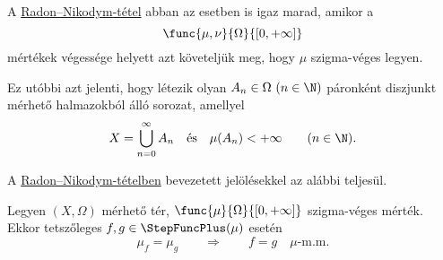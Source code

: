 \documentclass[
]{elteikthesis}[2024/04/26]
\begin{document}
	\begin{notes}
		\item
		A \hyperref[th:radon-nikodym]{Radon--Nikodym-tétel} abban az esetben is igaz marad,
		amikor a
		\[
			\func{\mu, \nu}{\Omega}{[0, +\infty]}
		\]
		mértékek végessége helyett azt követeljük meg, hogy \( \mu \) szigma-véges legyen.
		
		Ez utóbbi azt jelenti, hogy létezik olyan \( A_n \in \Omega \ (n \in \N) \)
		páronként diszjunkt mérhető halmazokból álló sorozat, amellyel
		\[
			X = \bigcup_{n = 0}^{\infty} A_n
			\quad \text{és} \quad
			\mu(A_n) < +\infty \qquad (n \in \N).
		\]
		
		\item
		A \hyperref[th:radon-nikodym]{Radon--Nikodym-tételben} bevezetett jelölésekkel az alábbi teljesül.
		
		\begin{theo*}
			Legyen \( (X, \Omega) \) mérhető tér, 
			\( \func{\mu}{\Omega}{[0, +\infty]} \) szigma-véges mérték. 
			Ekkor tetszőleges \( f,g \in \StepFuncPlus(\mu) \) esetén
			\[
				\mu_f = \mu_g
				\qquad \Longrightarrow \qquad
				f = g \quad \mu \text{-m.m.}
			\]
		\end{theo*}
		
	\end{notes}
	
	
%	
	
	
\end{document}

